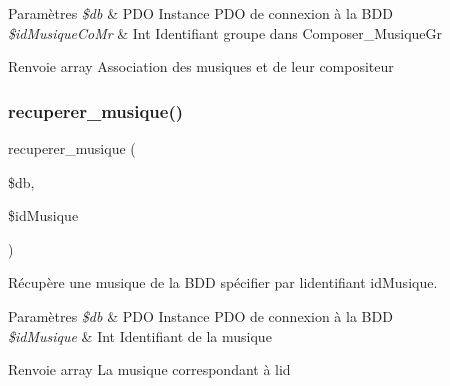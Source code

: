 \begin{DoxyParams}{Paramètres}
{\em \$db} & P\+DO Instance P\+DO de connexion à la B\+DD \\
\hline
{\em \$id\+Musique\+Co\+Mr} & Int Identifiant groupe dans Composer\+\_\+\+Musique\+Gr \\
\hline
\end{DoxyParams}
\begin{DoxyReturn}{Renvoie}
array Association des musiques et de leur compositeur 
\end{DoxyReturn}
\mbox{\label{fonctionMusique_8php_abde3ba80f1b39503056076dd0db4cca5}} 
\subsubsection{\texorpdfstring{recuperer\+\_\+musique()}{recuperer\_musique()}}
{\footnotesize\ttfamily recuperer\+\_\+musique (\begin{DoxyParamCaption}\item[{}]{\$db,  }\item[{}]{\$id\+Musique }\end{DoxyParamCaption})}



Récupère une musique de la B\+DD spécifier par l\textquotesingle{}identifiant \textquotesingle{}id\+Musique\textquotesingle{}. 


\begin{DoxyParams}{Paramètres}
{\em \$db} & P\+DO Instance P\+DO de connexion à la B\+DD \\
\hline
{\em \$id\+Musique} & Int Identifiant de la musique \\
\hline
\end{DoxyParams}
\begin{DoxyReturn}{Renvoie}
array La musique correspondant à l\textquotesingle{}id 
\end{DoxyReturn}
\mbox{\label{fonctionMusique_8php_af330ba4aeb1ac679ae0b8227be73e927}} 
